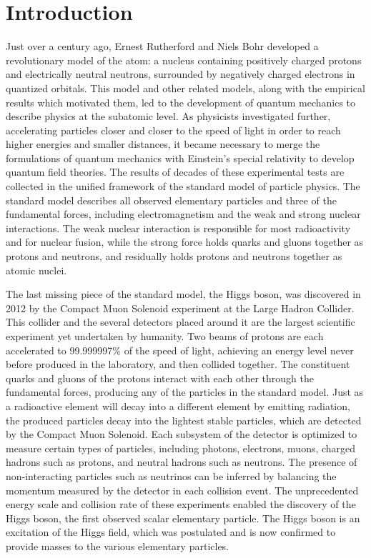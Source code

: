 \documentclass[12pt]{thesis}  %
\renewcommand{\baselinestretch}{2}
\begin{document}
\newpage
\setlength{\parskip}{0em}
\renewcommand{\baselinestretch}{2}
\normalsize

\setcounter{page}{1}
\chapter{Introduction
\label{ch:introduction}}

Just over a century ago, Ernest Rutherford and Niels Bohr developed a revolutionary model of the atom: a nucleus containing positively charged protons and electrically neutral neutrons, surrounded by negatively charged electrons in quantized orbitals. This model and other related models, along with the empirical results which motivated them, led to the development of quantum mechanics to describe physics at the subatomic level. As physicists investigated further, accelerating particles closer and closer to the speed of light in order to reach higher energies and smaller distances, it became necessary to merge the formulations of quantum mechanics with Einstein's special relativity to develop quantum field theories. The results of decades of these experimental tests are collected in the unified framework of the standard model of particle physics. The standard model describes all observed elementary particles and three of the fundamental forces, including electromagnetism and the weak and strong nuclear interactions. The weak nuclear interaction is responsible for most radioactivity and for nuclear fusion, while the strong force holds quarks and gluons together as protons and neutrons, and residually holds protons and neutrons together as atomic nuclei.

The last missing piece of the standard model, the Higgs boson, was discovered in 2012 by the Compact Muon Solenoid experiment at the Large Hadron Collider. This collider and the several detectors placed around it are the largest scientific experiment yet undertaken by humanity. Two beams of protons are each accelerated to 99.999997\% of the speed of light, achieving an energy level never before produced in the laboratory, and then collided together. The constituent quarks and gluons of the protons interact with each other through the fundamental forces, producing any of the particles in the standard model. Just as a radioactive element will decay into a different element by emitting radiation, the produced particles decay into the lightest stable particles, which are detected by the Compact Muon Solenoid. Each subsystem of the detector is optimized to measure certain types of particles, including photons, electrons, muons, charged hadrons such as protons, and neutral hadrons such as neutrons. The presence of non-interacting particles such as neutrinos can be inferred by balancing the momentum measured by the detector in each collision event. The unprecedented energy scale and collision rate of these experiments enabled the discovery of the Higgs boson, the first observed scalar elementary particle. The Higgs boson is an excitation of the Higgs field, which was postulated and is now confirmed to provide masses to the various elementary particles.
\end{document}
